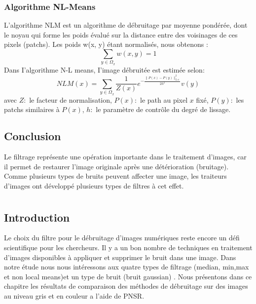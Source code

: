 \documentclass[12pt,a4paper]{report}
\numberwithin{equation}{subsection}
\numberwithin{equation}{section}
\begin{document}
\subsection{Algorithme NL-Means}
L’algorithme NLM est un algorithme de débruitage par moyenne
pondérée, dont le noyau qui forme les poids évalué sur la distance entre des voisinages de ces pixels (patchs). Les poids w(x, y) étant normalisés, nous obtenons :
\newline
$$\sum_{y \in \Omega_{x}} w(x, y)=1$$\newline
Dans I'algorithme N-L means, I'image débruitée est estimée selon:
\newline
$$N L M(x)=\sum_{y \in \Omega_{x}} \frac{1}{Z(x)} e^{-\frac{\| P(x)-P(y) \|_{2, a}^{2}}{2 h^{2}}} v(y)$$
\newline
avec
\newline
$Z:$ le facteur de normalisation,
\newline
$P(x):$ le path au pixel $x$ fixé,
\newline $P(y):$ les patchs similaires à $P(x)$,\newline
$h:$ le paramètre de contrôle du degré de lissage.\newline
\section{Conclusion}
Le filtrage représente une opération importante dans le traitement d’images, car il permet
de restaurer l’image originale après une détérioration (bruitage).\newline
Comme plusieurs types de bruits peuvent affecter une image, les traiteurs d’images ont
développé plusieurs types de filtres à cet effet.



\newpage

\chapter{}
\section{Introduction}
Le choix du filtre pour le débruitage d’images numériques reste encore un défi
scientifique pour les chercheurs. Il y a un bon nombre de techniques en traitement d'images
disponibles à appliquer et supprimer le bruit dans une image. Dans notre étude nous nous
intéressons aux quatre types de filtrage (median, min,max et non local means)et un type de bruit (bruit gaussian) .\newline
Nous présentons dans ce chapitre les résultats de comparaison des méthodes de
débruitage sur des images au niveau gris et en couleur a l'aide de PNSR.
\newline
\end{document}
